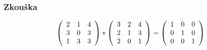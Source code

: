 \documentclass[a4paper]{article}
\begin{document}
\subsubsection{Zkouška}%
\begin{equation*}
\left(
\begin{array}{c c c}
    2 & 1 & 4 \\
    3 & 0 & 3 \\
    1 & 3 & 3
\end{array}
\right)
*
\left(
\begin{array}{c c c }
    3 & 2 & 4 \\
    2 & 1 & 3 \\
    2 & 0 & 1
\end{array}
\right)
=
\left(
\begin{array}{c c c}
    1 & 0 & 0\\
    0 & 1 & 0\\
    0 & 0 & 1
\end{array}
\right)
\end{equation*}
\end{document}
